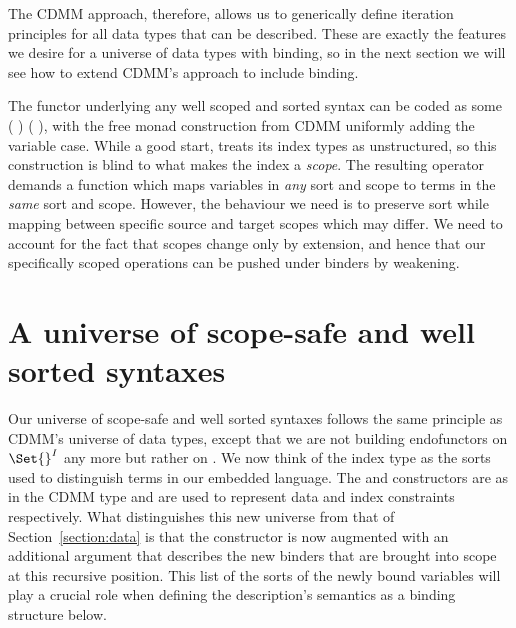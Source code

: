The CDMM approach, therefore, allows us to generically define iteration principles
for all data types that can be described. These are exactly the features we desire
for a universe of data types with binding, so in the next section we will see how
to extend CDMM's approach to include binding.

The functor underlying any well scoped and sorted syntax can be coded as some
{ (   ) (   )},
 with the
free monad construction from CDMM uniformly adding the variable case. While a
good start,  treats its index types as unstructured, so this construction
is blind to what makes the { } index a \emph{scope}.
The resulting
 operator demands a function which maps variables in \emph{any} sort and
scope to terms in the \emph{same} sort and scope. However, the behaviour we need
is to preserve sort while mapping between specific source and target scopes which
may differ. We need to account for the fact that scopes change only by extension,
and hence that our specifically scoped operations can be pushed under binders by
weakening.




\section{A universe of scope-safe and well sorted syntaxes}\label{section:universe}

Our universe of scope-safe and well sorted syntaxes follows the same principle
as CDMM's universe of data types, except that we are not building endofunctors on
$\Set{}^I$ any more but rather on { }. We now think of the
index type  as the sorts
used to distinguish terms in our embedded language. The  and
 constructors are as in the CDMM  type and are used to
represent data and index constraints respectively.
What distinguishes this new universe  from that of Section~\ref{section:data}
is that the
 constructor
is now augmented with an additional { } argument that describes
the new binders that are brought into scope at this recursive position. This
list of the sorts of the newly bound variables will play a crucial role when
defining the description's semantics as a binding structure below. %

